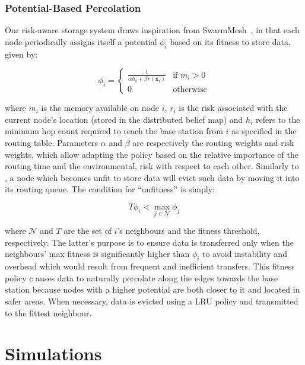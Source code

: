 \subsubsection{Potential-Based Percolation}
Our risk-aware storage system draws inspiration from 
SwarmMesh~\cite{majcherczykSwarmmesh2020}, in that each node periodically assigns
itself a potential $\phi_i$ based on its fitness to store data, given by:

\begin{equation}
        \phi_i =
        \left\{ 
        \begin{array}{ll}
            \frac{1}{\alpha h_i + \beta r({\bm{x}_i})} &\text{if } m_i > 0 \\
            0 &\text{otherwise}
        \end{array} \right.
        \label{equation:fitness}
\end{equation}

 where $m_i$ is the memory available on node $i$, $r_i$ is the risk
 associated with the current node's location (stored in the
 distributed belief map) and $h_i$ refers to the minimum hop count
 required to reach the base station from $i$ as specified in the
 routing table. Parameters $\alpha$ and $\beta$ are respectively the routing weights and 
 risk weights, which allow adapting the policy based on the relative importance of the 
 routing time and the environmental, risk with respect to each other. Similarly to 
 \cite{majcherczykSwarmmesh2020}, a node  which becomes unfit to store data will evict such 
 data by moving it into its routing queue. The condition for ``unfitness'' is simply:

\begin{equation}
    T\phi_i < \max_{j \in \mathcal{N}} \phi_j
\end{equation}

where $\mathcal{N}$ and $T$ are the set of $i$'s neighbours and the fitness threshold, 
respectively. The latter's purpose is to ensure data is transferred only when the 
neighbours' max fitness is significantly higher than $\phi_i$ to avoid instability and 
overhead which would result from frequent and inefficient transfers. This fitness policy  c
auses data to naturally percolate along the edges towards the base station because nodes 
with a higher potential are both closer to it and
located in safer areas. When necessary, data is evicted using a \ac{LRU} policy and transmitted to the fittest neighbour.


\section{Simulations}
\label{Simulations}

